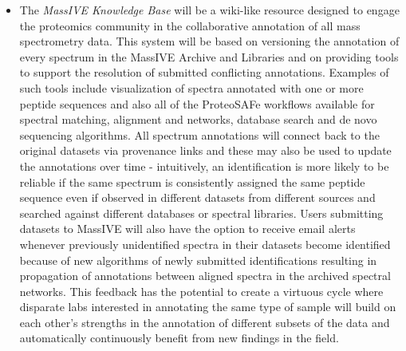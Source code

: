 \documentclass[arial,11pt]{article}
\begin{document}
\begin{itemize}
\item The {\em MassIVE Knowledge Base} will be a wiki-like resource designed to engage the proteomics community in the collaborative annotation of all mass spectrometry data. This system will be based on versioning the annotation of every spectrum in the MassIVE Archive and Libraries and on providing tools to support the resolution of submitted conflicting annotations. Examples of such tools include visualization of spectra annotated with one or more peptide sequences and also all of the ProteoSAFe workflows available for spectral matching, alignment and networks, database search and de novo sequencing algorithms. All spectrum annotations will connect back to the original datasets via provenance links and these may also be used to update the annotations over time \-- intuitively, an identification is more likely to be reliable if the same spectrum is consistently assigned the same peptide sequence even if observed in different datasets from different sources and searched against different databases or spectral libraries. Users submitting datasets to MassIVE will also have the option to receive email alerts whenever previously unidentified spectra in their datasets become identified because of new algorithms of newly submitted identifications resulting in propagation of annotations between aligned spectra in the archived spectral networks. This feedback has the potential to create a virtuous cycle where disparate labs interested in annotating the same type of sample will build on each other's strengths in the annotation of different subsets of the data and automatically continuously benefit from new findings in the field.
\end{itemize}

\end{document}
